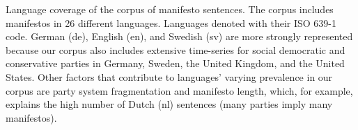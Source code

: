 Language coverage of the corpus of manifesto sentences. The corpus includes manifestos in 26 different languages. Languages denoted with their ISO 639-1 code. German (de), English (en), and Swedish (sv) are more strongly represented because our corpus also includes extensive time-series for social democratic and conservative parties in Germany, Sweden, the United Kingdom, and the United States. Other factors that contribute to languages' varying prevalence in our corpus are party system fragmentation and manifesto length, which, for example, explains the high number of Dutch (nl) sentences (many parties imply many manifestos).